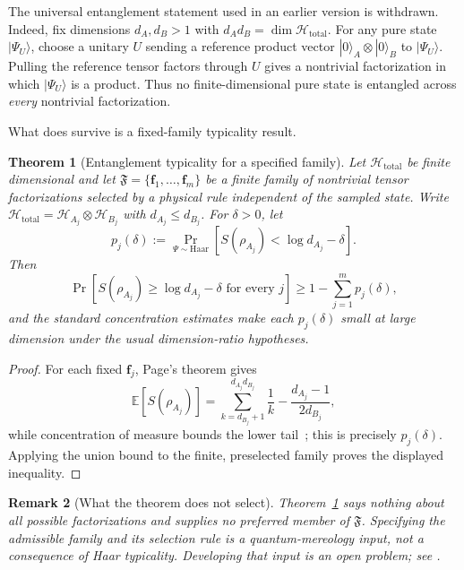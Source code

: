 \documentclass[12pt,a4paper,openany]{book}
\newtheorem{theorem}{Theorem}[chapter]
\newtheorem{remark}[theorem]{Remark}
\begin{document}
The universal entanglement statement used in an earlier version is withdrawn.  Indeed, fix dimensions $d_A,d_B>1$ with $d_Ad_B=\dim\mathcal H_{\mathrm{total}}$.  For any pure state $|\Psi_U\rangle$, choose a unitary $U$ sending a reference product vector $|0\rangle_A\otimes|0\rangle_B$ to $|\Psi_U\rangle$.  Pulling the reference tensor factors through $U$ gives a nontrivial factorization in which $|\Psi_U\rangle$ is a product.  Thus no finite-dimensional pure state is entangled across \emph{every} nontrivial factorization.

What does survive is a fixed-family typicality result.

\begin{theorem}[Entanglement typicality for a specified family]
\label{A-thm:nofact}
Let $\mathcal H_{\mathrm{total}}$ be finite dimensional and let
$\mathfrak F=\{\mathbf f_1,\ldots,\mathbf f_m\}$ be a finite family of
nontrivial tensor factorizations selected by a physical rule independent
of the sampled state.  Write
$\mathcal H_{\mathrm{total}}=\mathcal H_{A_j}\otimes\mathcal H_{B_j}$
with $d_{A_j}\le d_{B_j}$.  For $\delta>0$, let
\[
p_j(\delta):=
\Pr_{\Psi\sim\mathrm{Haar}}
\left[S(\rho_{A_j})<\log d_{A_j}-\delta\right].
\]
Then
\[
\Pr\left[
S(\rho_{A_j})\ge\log d_{A_j}-\delta
\text{ for every }j
\right]
\ge 1-\sum_{j=1}^m p_j(\delta),
\]
and the standard concentration estimates make each $p_j(\delta)$ small
at large dimension under the usual dimension-ratio hypotheses.
\end{theorem}

\begin{proof}
For each fixed $\mathbf f_j$, Page's theorem gives~\cite{Page1993}
\begin{equation}
\label{A-eq:page}
\mathbb{E}[S(\rho_{A_j})]
=\sum_{k=d_{B_j}+1}^{d_{A_j}d_{B_j}}\frac1k
-\frac{d_{A_j}-1}{2d_{B_j}},
\end{equation}
while concentration of measure bounds the lower tail~\cite{HaydenLeungWinter2006}; this is precisely $p_j(\delta)$.  Applying the union bound to the finite, preselected family proves the displayed inequality.
\end{proof}

\begin{remark}[What the theorem does not select]
Theorem~\ref{A-thm:nofact} says nothing about all possible factorizations and supplies no preferred member of $\mathfrak F$.  Specifying the admissible family and its selection rule is a quantum-mereology input, not a consequence of Haar typicality.  Developing that input is an open problem; see \cite{Cotler2019,CarrollSingh2021}.
\end{remark}
\end{document}
